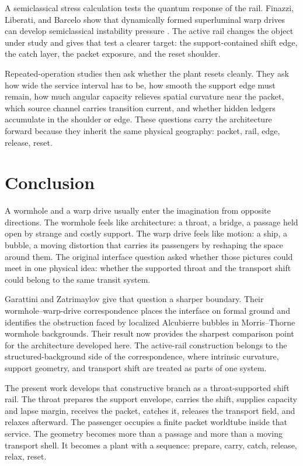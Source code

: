 \documentclass[11pt]{article}
\begin{document}
A semiclassical stress calculation tests the quantum response of the rail. Finazzi, Liberati, and Barcelo show that dynamically formed superluminal warp drives can develop semiclassical instability pressure \citep{finazzi_liberati_barcelo_2009}. The active rail changes the object under study and gives that test a clearer target: the support-contained shift edge, the catch layer, the packet exposure, and the reset shoulder.

Repeated-operation studies then ask whether the plant resets cleanly. They ask how wide the service interval has to be, how smooth the support edge must remain, how much angular capacity relieves spatial curvature near the packet, which source channel carries transition current, and whether hidden ledgers accumulate in the shoulder or edge. These questions carry the architecture forward because they inherit the same physical geography: packet, rail, edge, release, reset.

\section{Conclusion}

A wormhole and a warp drive usually enter the imagination from opposite directions. The wormhole feels like architecture: a throat, a bridge, a passage held open by strange and costly support. The warp drive feels like motion: a ship, a bubble, a moving distortion that carries its passengers by reshaping the space around them. The original interface question asked whether those pictures could meet in one physical idea: whether the supported throat and the transport shift could belong to the same transit system.

Garattini and Zatrimaylov give that question a sharper boundary. Their wormhole--warp-drive correspondence places the interface on formal ground and identifies the obstruction faced by localized Alcubierre bubbles in Morris--Thorne wormhole backgrounds. Their result now provides the sharpest comparison point for the architecture developed here. The active-rail construction belongs to the structured-background side of the correspondence, where intrinsic curvature, support geometry, and transport shift are treated as parts of one system.

The present work develops that constructive branch as a throat-supported shift rail. The throat prepares the support envelope, carries the shift, supplies capacity and lapse margin, receives the packet, catches it, releases the transport field, and relaxes afterward. The passenger occupies a finite packet worldtube inside that service. The geometry becomes more than a passage and more than a moving transport shell. It becomes a plant with a sequence: prepare, carry, catch, release, relax, reset.
\end{document}
